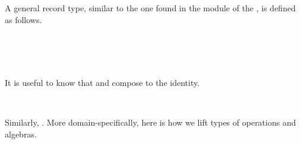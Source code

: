 \documentclass[a4paper,UKenglish,cleveref,autoref,thm-restate]{lipics-v2021}
\begin{document}
A general  record type, similar to the one found in the  module of the \agdastdlib, is
defined as follows.
\ccpad
\begin{code}%
\>[0]\AgdaSpace{}%
\AgdaSpace{}%
\AgdaSymbol{\{}\AgdaSpace{}%
\AgdaSpace{}%
\AgdaSymbol{:}\AgdaSpace{}%
\AgdaSymbol{\}}\AgdaSpace{}%
\AgdaSymbol{(}\AgdaSpace{}%
\AgdaSymbol{:}\AgdaSpace{}%
\AgdaSpace{}%
\AgdaSymbol{)}\AgdaSpace{}%
\AgdaSymbol{:}\AgdaSpace{}%
\AgdaSpace{}%
\AgdaSpace{}%
\AgdaSpace{}%
%
\>[50]\<%
\\
\>[0][@{}l@{\AgdaIndent{0}}]%
\>[1]\AgdaSpace{}%
\<%
\\
%
\>[1]\AgdaSpace{}%
\AgdaSpace{}%
\AgdaSymbol{:}\AgdaSpace{}%
\<%
\\
\>[0]\AgdaSpace{}%
\<%
\end{code}
\ccpad
It is useful to know that  and  compose to the identity.
\ccpad
\begin{code}%
\>[0]\AgdaSpace{}%
\AgdaSymbol{:}\AgdaSpace{}%
\AgdaSymbol{\{}\AgdaSpace{}%
\AgdaSpace{}%
\AgdaSymbol{:}\AgdaSpace{}%
\AgdaSymbol{\}\{}\AgdaSpace{}%
\AgdaSymbol{:}\AgdaSpace{}%
\AgdaSpace{}%
\AgdaSymbol{\}}\AgdaSpace{}%
\AgdaSpace{}%
\AgdaSymbol{\{}\AgdaSymbol{\}\{}\AgdaSymbol{\}}\AgdaSpace{}%
\AgdaSpace{}%
\AgdaSpace{}%
\AgdaSpace{}%
\AgdaSpace{}%
\<%
\\
\>[0]\AgdaSpace{}%
\AgdaSymbol{=}\AgdaSpace{}%
\AgdaSpace{}%
\AgdaSymbol{\AgdaUnderscore{}}\<%
\end{code}
\ccpad
Similarly, \AgdaSpace{}\AgdaSpace{}\AgdaSpace{}\AgdaSpace{}\AgdaSpace{}%
\AgdaSymbol{(}\AgdaSymbol{\{}\AgdaSymbol{\}\{}\AgdaSymbol{\}}.
More domain-specifically, here is how we lift types of operations and algebras.
\ccpad
\begin{code}%
  
\end{code}
\end{document}
